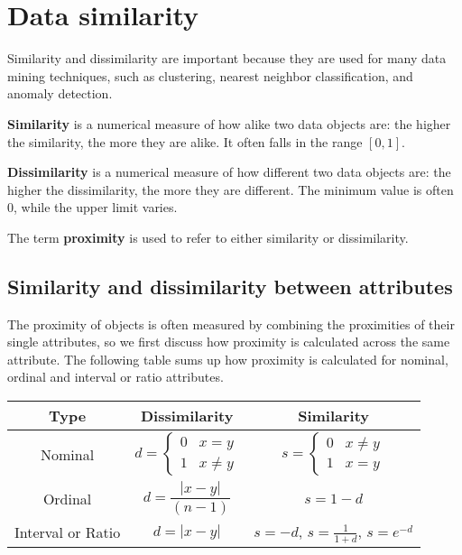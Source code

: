 \chapter{Data similarity}

Similarity and dissimilarity are important because they are used for many data mining techniques, such as clustering, nearest neighbor classification, and anomaly detection.

\textbf{Similarity} is a numerical measure of how alike two data objects are: the higher the similarity, the more they are alike. It often falls in the range $[0,1]$.

\textbf{Dissimilarity} is a numerical measure of how different two data objects are: the higher the dissimilarity, the more they are different. The minimum value is often $0$, while the upper limit varies.

The term \textbf{proximity} is used to refer to either similarity or dissimilarity.

\section{Similarity and dissimilarity between attributes}

The proximity of objects is often measured by combining the proximities of their single attributes, so we first discuss how proximity is calculated across the same attribute.
The following table sums up how proximity is calculated for nominal, ordinal and interval or ratio attributes.

\begin{table}[h]
    \centering
    \begin{tabular}{c|c|c}
        Type & Dissimilarity & Similarity \\
        \hline
        Nominal & $d=\begin{cases}
                    0 & x = y \\
                    1 & x \neq y
                    \end{cases}$ & $s=\begin{cases}
                    0 & x \neq y \\
                    1 & x = y
                    \end{cases}$ \\
        \hline
        Ordinal & $d = \dfrac{|x-y|}{(n-1)}$ & $s = 1-d$\\
        \hline
        Interval or Ratio & $d = |x - y|$ & $s = -d$, $s=\frac{1}{1+d}$, $s = e^{-d}$\\
    \end{tabular}
\end{table}

